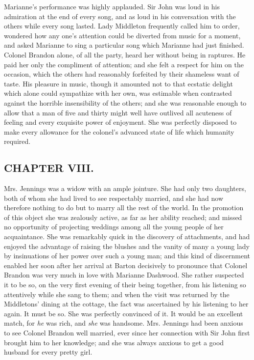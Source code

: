 Marianne's performance was highly applauded. Sir John was loud in his admiration at the end of every song, and as loud in his conversation with the others while every song lasted. Lady Middleton frequently called him to order, wondered how any one's attention could be diverted from music for a moment, and asked Marianne to sing a particular song which Marianne had just finished. Colonel Brandon alone, of all the party, heard her without being in raptures. He paid her only the compliment of attention; and she felt a respect for him on the occasion, which the others had reasonably forfeited by their shameless want of taste. His pleasure in music, though it amounted not to that ecstatic delight which alone could sympathize with her own, was estimable when contrasted against the horrible insensibility of the others; and she was reasonable enough to allow that a man of five and thirty might well have outlived all acuteness of feeling and every exquisite power of enjoyment. She was perfectly disposed to make every allowance for the colonel's advanced state of life which humanity required.

\subsection[chapter-viii.]{\useURL[url8][][][]\from[url8]CHAPTER VIII.}

Mrs. Jennings was a widow with an ample jointure. She had only two daughters, both of whom she had lived to see respectably married, and she had now therefore nothing to do but to marry all the rest of the world. In the promotion of this object she was zealously active, as far as her ability reached; and missed no opportunity of projecting weddings among all the young people of her acquaintance. She was remarkably quick in the discovery of attachments, and had enjoyed the advantage of raising the blushes and the vanity of many a young lady by insinuations of her power over such a young man; and this kind of discernment enabled her soon after her arrival at Barton decisively to pronounce that Colonel Brandon was very much in love with Marianne Dashwood. She rather suspected it to be so, on the very first evening of their being together, from his listening so attentively while she sang to them; and when the visit was returned by the Middletons' dining at the cottage, the fact was ascertained by his listening to her again. It must be so. She was perfectly convinced of it. It would be an excellent match, for {\em he} was rich, and {\em she} was handsome. Mrs. Jennings had been anxious to see Colonel Brandon well married, ever since her connection with Sir John first brought him to her knowledge; and she was always anxious to get a good husband for every pretty girl.

